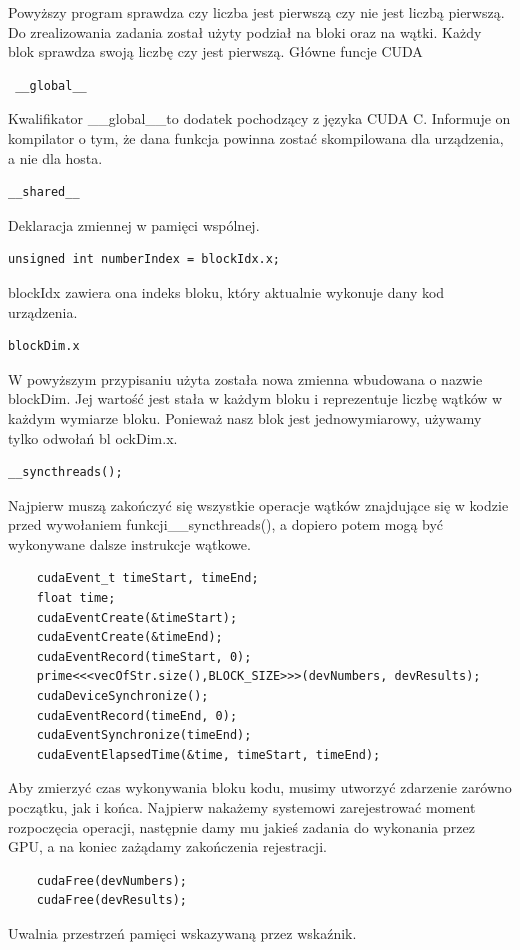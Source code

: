 \documentclass[a4paper,11pt]{article}
\begin{document}
Powyższy program sprawdza czy liczba jest pierwszą czy nie jest liczbą pierwszą. Do zrealizowania zadania został użyty podział na bloki oraz na wątki. Każdy blok sprawdza swoją liczbę czy jest pierwszą.
\newline
Główne funcje CUDA
\begin{lstlisting}
 __global__
\end{lstlisting}
Kwalifikator \_\_global\_\_to dodatek pochodzący z języka CUDA C. Informuje on kompilator
o tym, że dana funkcja powinna zostać skompilowana dla urządzenia, a nie dla hosta. 
\newline
\begin{lstlisting}
__shared__
\end{lstlisting}
Deklaracja zmiennej w pamięci wspólnej.
\newline
\begin{lstlisting}
unsigned int numberIndex = blockIdx.x;
\end{lstlisting}
blockIdx zawiera ona indeks bloku, który aktualnie wykonuje dany kod urządzenia.
\newline
\begin{lstlisting}
blockDim.x
\end{lstlisting}
W powyższym przypisaniu użyta została nowa zmienna wbudowana o nazwie blockDim. Jej
wartość jest stała w każdym bloku i reprezentuje liczbę wątków w każdym wymiarze bloku. Ponieważ nasz blok jest jednowymiarowy, używamy tylko odwołań bl ockDim.x.
\newline
\begin{lstlisting}
__syncthreads();
\end{lstlisting}
Najpierw muszą zakończyć się wszystkie operacje wątków znajdujące się w kodzie przed wywołaniem funkcji\_\_syncthreads(), a dopiero potem mogą być wykonywane dalsze instrukcje wątkowe.

\begin{lstlisting}
	cudaEvent_t timeStart, timeEnd;
	float time;
	cudaEventCreate(&timeStart);
	cudaEventCreate(&timeEnd);
	cudaEventRecord(timeStart, 0);
	prime<<<vecOfStr.size(),BLOCK_SIZE>>>(devNumbers, devResults);
	cudaDeviceSynchronize();
	cudaEventRecord(timeEnd, 0);
	cudaEventSynchronize(timeEnd);
	cudaEventElapsedTime(&time, timeStart, timeEnd);
\end{lstlisting}
Aby zmierzyć czas wykonywania bloku kodu, musimy utworzyć zdarzenie zarówno początku, jak
i końca. Najpierw nakażemy systemowi zarejestrować moment rozpoczęcia operacji, następnie damy
mu jakieś zadania do wykonania przez GPU, a na koniec zażądamy zakończenia rejestracji.
\begin{lstlisting}
	cudaFree(devNumbers);
	cudaFree(devResults);
\end{lstlisting}
Uwalnia przestrzeń pamięci wskazywaną przez wskaźnik.
\end{document}
